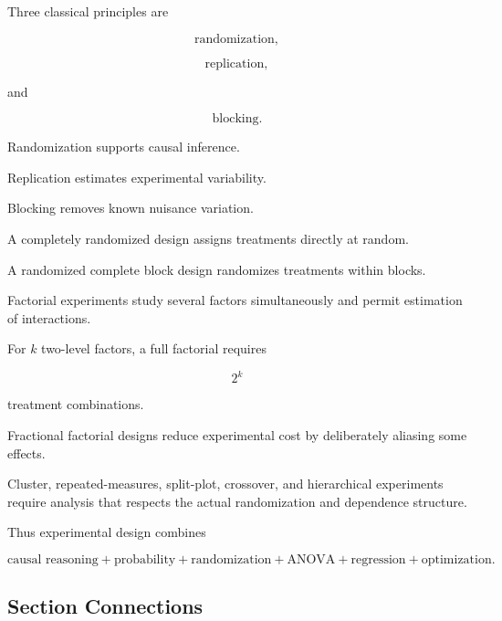 Three classical principles are

\[
\boxed{
\text{randomization},
}
\]

\[
\boxed{
\text{replication},
}
\]

and

\[
\boxed{
\text{blocking}.
}
\]

Randomization supports causal inference.

Replication estimates experimental variability.

Blocking removes known nuisance variation.

A completely randomized design assigns treatments directly at random.

A randomized complete block design randomizes treatments within blocks.

Factorial experiments study several factors simultaneously and permit
estimation of interactions.

For \(k\) two-level factors, a full factorial requires

\[
\boxed{
2^k
}
\]

treatment combinations.

Fractional factorial designs reduce experimental cost by deliberately
aliasing some effects.

Cluster, repeated-measures, split-plot, crossover, and hierarchical
experiments require analysis that respects the actual randomization and
dependence structure.

Thus experimental design combines

\[
\boxed{
\text{causal reasoning}
+
\text{probability}
+
\text{randomization}
+
\text{ANOVA}
+
\text{regression}
+
\text{optimization}.
}
\]

\subsection{Section Connections}
\label{subsec:experimental-design-connections}


